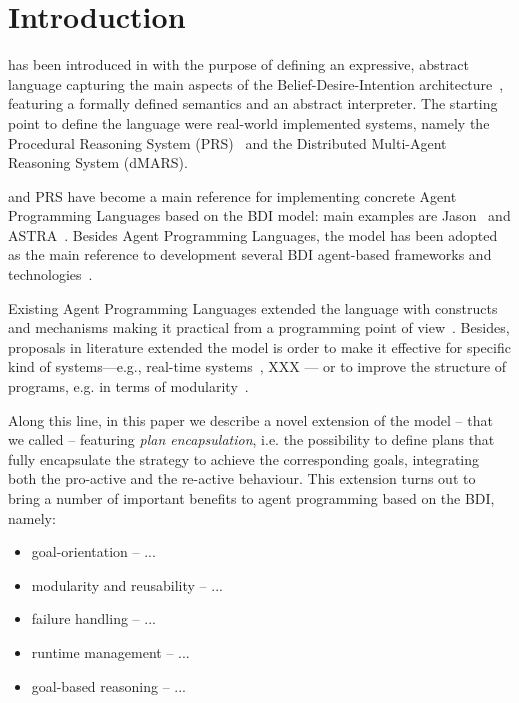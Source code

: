 \section{Introduction}
\label{sec:intro}


%
%
{\asl} has been introduced in \cite{Rao96}  with the purpose of defining an expressive, 
abstract language capturing the main aspects of the Belief-Desire-Intention architecture~\cite{Bratman88,Georgeff:1987:RRP:1863766.1863818}, featuring a formally defined semantics and an abstract interpreter.
%
The starting point to define the language were real-world implemented systems, namely the
Procedural Reasoning System (PRS)~\cite{Ingrand:1992:ARR:629535.629890} and the Distributed Multi-Agent Reasoning System (dMARS).
%

%
% 
{\asl}  and PRS have become a main reference for implementing concrete Agent Programming Languages 
based on the BDI model: 
%
main examples are Jason~\cite{jason06,bordini:07} and ASTRA~\cite{DBLP:conf/prima/CollierRL15}.
%
Besides Agent Programming Languages,  the {\asl}  model has been adopted as the main reference to development several BDI agent-based frameworks and technologies~\cite{BordiniMAPlpa,BordiniMAPlta}.


%
%
Existing Agent Programming Languages extended the language with constructs and mechanisms making it  practical from a programming point of view~\cite{jason06}.
%
Besides, proposals in literature extended the model is order to make it effective for specific kind of systems---e.g., real-time systems~\cite{Vikhorev:2011:APP:2030470.2030529}, XXX --- or to improve the structure of programs, e.g. in terms of modularity~\cite{Madden2010,Nunes2014}.

%
Along this line, in this paper we describe a novel extension of the {\asl}  model -- that we called {\aser} -- featuring \emph{plan encapsulation}, i.e. the possibility to define plans that fully encapsulate the strategy to achieve the corresponding goals, integrating both the pro-active and the re-active behaviour.
%
%
This extension turns out to bring a number of important benefits to agent programming based on the BDI, namely:
%
\begin{itemize}
\item goal-orientation -- ...
\item modularity and reusability -- ...
\item failure handling -- ...
\item runtime management -- ...
\item goal-based reasoning -- ...
\end{itemize}


